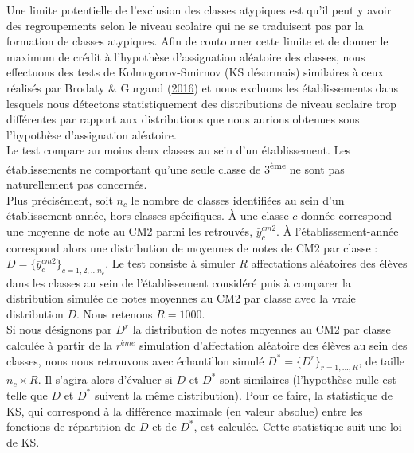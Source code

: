 \documentclass[
]{book}
\begin{document}
\quad Une limite potentielle de l'exclusion des classes atypiques est qu'il peut y avoir des regroupements selon le niveau scolaire qui ne se traduisent pas par la formation de classes atypiques. Afin de contourner cette limite et de donner le maximum de crédit à l'hypothèse d'assignation aléatoire des classes, nous effectuons des tests de Kolmogorov-Smirnov (KS désormais) similaires à ceux réalisés par Brodaty \& Gurgand (\protect\hyperlink{ref-BRO:GUR:16}{2016}) et nous excluons les établissements dans lesquels nous détectons statistiquement des distributions de niveau scolaire trop différentes par rapport aux distributions que nous aurions obtenues sous l'hypothèse d'assignation aléatoire.\\
Le test compare au moins deux classes au sein d'un établissement. Les établissements ne comportant qu'une seule classe de 3\textsuperscript{ème} ne sont pas naturellement pas concernés.\\
Plus précisément, soit \(n_{c}\) le nombre de classes identifiées au sein d'un établissement-année, hors classes spécifiques. À une classe \(c\) donnée correspond une moyenne de note au CM2 parmi les retrouvés, \(\bar{y}^{cm2}_c\). À l'établissement-année correspond alors une distribution de moyennes de notes de CM2 par classe : \(D = \{\bar{y}^{cm2}_c\}_{c = 1, 2, ...n_c}\). Le test consiste à simuler \(R\) affectations aléatoires des élèves dans les classes au sein de l'établissement considéré puis à comparer la distribution simulée de notes moyennes au CM2 par classe avec la vraie distribution \(D\). Nous retenons \(R = 1000\).\\
Si nous désignons par \(D^r\) la distribution de notes moyennes au CM2 par classe calculée à partir de la \(r^{ème}\) simulation d'affectation aléatoire des élèves au sein des classes, nous nous retrouvons avec échantillon simulé \(D^* = \{D^r\}_{r = 1, ..., R}\), de taille \(n_c \times R\). Il s'agira alors d'évaluer si \(D\) et \(D^*\) sont similaires (l'hypothèse nulle est telle que \(D\) et \(D^*\) suivent la même distribution). Pour ce faire, la statistique de KS, qui correspond à la différence maximale (en valeur absolue) entre les fonctions de répartition de \(D\) et de \(D^*\), est calculée. Cette statistique suit une loi de KS.
\end{document}

